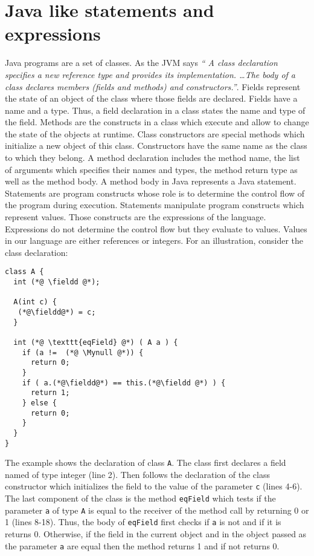 
\newtheorem{Expression}{Definition}[section]
\newtheorem{ExpressionRel}[Expression]{Definition}
\newtheorem{Statement}[Expression]{Definition}

\section{Java like statements and expressions} \label{source}
 
 Java programs are a set of classes. 
 As the JVM says \textit{`` A class declaration specifies a new reference type and provides its implementation. \ldots The body of a class declares members (fields and methods) and constructors.''}. Fields represent the state of an object of the class where those fields are declared. 
Fields have a name and a type. Thus, a  field declaration in a class states the name and type of the field.
Methods are the constructs in a class which execute and allow to change the state of the objects at runtime.
Class constructors are special methods which  initialize a new object of this class. 
Constructors have the same name as the class to which they belong. 
 A method declaration includes
 the method name, the list of arguments which specifies their names and  types, the method return type as well as the method body.
A method body in Java represents a Java statement. Statements are program constructs whose role is to determine the control flow of the program during execution. 
Statements manipulate program constructs which represent values. Those constructs are the expressions of the language.
Expressions do not determine the control flow but they evaluate to values. Values in our language are either references
 or integers.
For an illustration, consider the class declaration:
\lstset{numbers=left}
\begin{lstlisting}[frame=trbl] 
class A {
  int (*@ \fieldd @*);
  
  A(int c) {
   (*@\fieldd@*) = c;
  }

  int (*@ \texttt{eqField} @*) ( A a ) {
    if (a !=  (*@ \Mynull @*)) {
      return 0;
    }
    if ( a.(*@\fieldd@*) == this.(*@\fieldd @*) ) {
      return 1;
    } else {
      return 0;
    }
  }
}
\end{lstlisting}


The example shows  the declaration of class  \lstinline!A!.
The class first declares a field named \fieldd{} of type integer (line 2).
 Then follows the declaration of the class  constructor which initializes the field \fieldd{} to the value
of the parameter \lstinline!c! (lines 4-6). The last component of the class is the  method \texttt{eqField}
 which tests if the parameter \lstinline!a! of type  \lstinline!A!  is
 equal to the receiver of the method call by returning 0 or 1 (lines 8-18).
 Thus, the body of \texttt{eqField} first checks if  \lstinline!a!
 is not \Mynull{} and if it is returns 0. Otherwise, if the field  \fieldd{} in the current object  and in the object 
passed as the parameter \lstinline!a! are equal then the method returns 1 and if not returns 0. 



